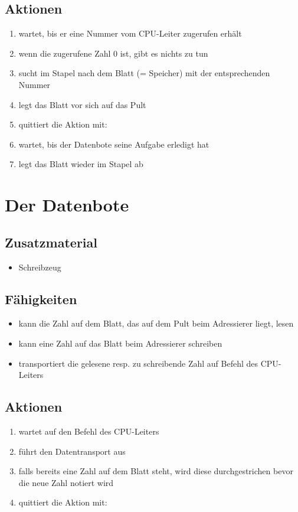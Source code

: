 \documentclass[a4paper]{kinet-intern}
\begin{document}
\subsection*{Aktionen}
\begin{enumerate}
	\item wartet, bis er eine Nummer vom CPU-Leiter zugerufen erhält
	\item wenn die zugerufene Zahl 0 ist, gibt es nichts zu tun
	\item sucht im Stapel nach dem Blatt (= Speicher) mit der entsprechenden Nummer
	\item legt das Blatt vor sich auf das Pult
	\item quittiert die Aktion mit: 
	\item wartet, bis der Datenbote seine Aufgabe erledigt hat
	\item legt das Blatt wieder im Stapel ab
\end{enumerate}


\vspace{1cm}
\section*{Der Datenbote}

\subsection*{Zusatzmaterial}
\begin{itemize}
	\item Schreibzeug
\end{itemize}

\subsection*{Fähigkeiten}
\begin{itemize}
	\item kann die Zahl auf dem Blatt, das auf dem Pult beim Adressierer liegt, lesen
	\item kann eine Zahl auf das Blatt beim Adressierer schreiben
	\item transportiert die gelesene resp. zu schreibende Zahl auf Befehl des CPU-Leiters
\end{itemize}

\subsection*{Aktionen}
\begin{enumerate}
	\item wartet auf den Befehl des CPU-Leiters
	\item führt den Datentransport aus
	\item falls bereits eine Zahl auf dem Blatt steht, wird diese durchgestrichen bevor die neue Zahl notiert wird
	\item quittiert die Aktion mit: 
\end{enumerate}
\end{document}
